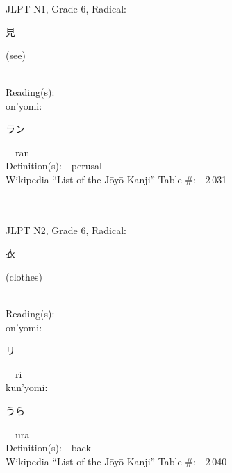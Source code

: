 \begin{multicols}{2}
{\fontsize{34pt}{40pt}  }\ \ \\  %
{JLPT N1, Grade 6, Radical:\ \ {\begin{CJK}{UTF8}{min} 見 \end{CJK}} (see) } \\
Reading(s):\ \ \\
{\hspace*{1em}}on'yomi:\ \ \\
{\hspace*{2em}}{\begin{CJK}{UTF8}{min} ラン \end{CJK}}\ \ ran\ \ \\
Definition(s):\ \ perusal \\
Wikipedia ``List of the J\=oy\=o Kanji'' Table \#:\ \ 2\,031 \\
\ \ \\
{\fontsize{34pt}{40pt}  }\ \ \\  %
{JLPT N2, Grade 6, Radical:\ \ {\begin{CJK}{UTF8}{min} 衣 \end{CJK}} (clothes) } \\
Reading(s):\ \ \\
{\hspace*{1em}}on'yomi:\ \ \\
{\hspace*{2em}}{\begin{CJK}{UTF8}{min} リ \end{CJK}}\ \ ri\ \ \\
{\hspace*{1em}}kun'yomi:\ \ \\
{\hspace*{2em}}{\begin{CJK}{UTF8}{min} うら \end{CJK}}\ \ ura\ \ \\
Definition(s):\ \ back \\
Wikipedia ``List of the J\=oy\=o Kanji'' Table \#:\ \ 2\,040 \\
\ \ \\
{\fontsize{34pt}{40pt}  }\ \ \\  %

\end{multicols}
